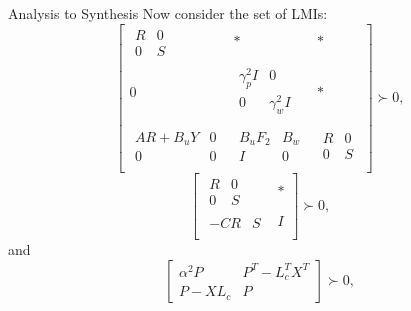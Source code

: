 \begin{frame}{Analysis to Synthesis}
	Now consider the set of LMIs:
	\begin{equation}\label{eqn:LMI_synthesis_cond_1}
	\left[
	\begin{array}{c|c|c}
	\begin{array}{ccc}
	R & 0\\
	0 & S 
	\end{array} & * & * \\
	\hline
	0 & \begin{array}{ccc}
	\gamma_p^2I & 0\\
	0 & \gamma_w^2I\\
	\end{array} & *\\
	\hline
	\begin{array}{ccc}
	AR+B_uY & 0\\
	0 & 0 
	\end{array} & 
	\begin{array}{ccc}
	B_uF_2 & B_w\\
	I & 0 
	\end{array} & 
	\begin{array}{ccc}
	R & 0\\
	0 & S 
	\end{array}\\
	\end{array}
	\right]\succ0,
	\end{equation}
	\begin{equation}\label{eqn:LMI_synthesis_cond_2}
	\left[
	\begin{array}{c|c}
	\begin{array}{ccc}
	R & 0\\
	0 & S 
	\end{array} & *\\
	\hline
	\begin{array}{ccc}
	-CR & S
	\end{array} & I \\
	\end{array}\right]\succ 0,
	\end{equation}
	and 
	\begin{equation} \label{eqn:LMI_pos_synthesis}
	\begin{bmatrix}
	\alpha^2 P & P^T-L_c^TX^T \\
	P-XL_c& P
	\end{bmatrix} \succ 0,
	\end{equation}
\end{frame}
